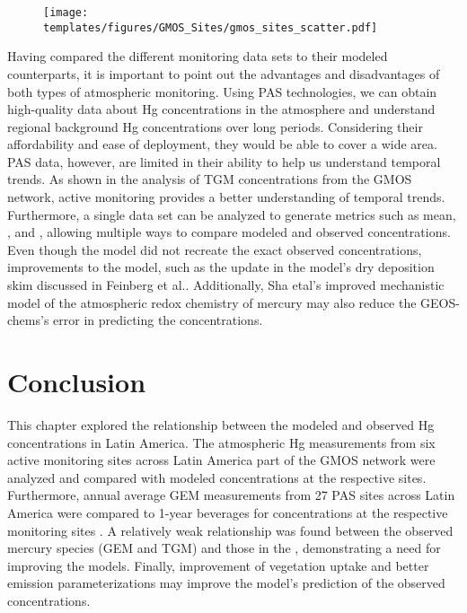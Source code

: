  \begin{figure}[H]
\texttt{[image: templates/figures/GMOS\_Sites/gmos\_sites\_scatter.pdf]}
\centering
{}
\label{fig:gmos_sites_scatter}
\end{figure}
\FloatBarrier
\begin{flushleft}
 Having compared the different monitoring data sets to their modeled counterparts, it is important to point out the advantages and disadvantages of both types of atmospheric monitoring. Using PAS technologies, we can obtain high-quality data about Hg concentrations in the atmosphere and understand regional background Hg concentrations over long periods. Considering their affordability and ease of deployment, they would be able to cover a wide area. PAS data, however, are limited in their ability to help us understand temporal trends. As shown in the analysis of TGM concentrations from the GMOS network, active monitoring provides a better understanding of temporal trends. Furthermore, a single data set can be analyzed to generate metrics such as mean, \iq, and \nft, allowing multiple ways to compare modeled and observed concentrations.  Even though the model did not recreate the exact observed concentrations, improvements to the model, such as the update in the model's dry deposition skim discussed in Feinberg et al.\cite{feinberg_evaluating_2022}. Additionally, Sha etal\cite{shah_improved_2021}'s improved mechanistic model of the atmospheric redox chemistry of mercury may also reduce the GEOS-chems's error in predicting the concentrations.
\end{flushleft}

\section{Conclusion}\label{c2_conclusion}

\begin{flushleft}
This chapter explored the relationship between the modeled and observed Hg concentrations in Latin America. The atmospheric Hg measurements from six active monitoring sites  across Latin America part of the GMOS network were analyzed and compared with modeled \hg concentrations at the respective sites\cite{koenig_seasonal_2021,sprovieri_atmospheric_2016}. Furthermore, annual average GEM measurements from 27 PAS sites across Latin America were compared to 1-year beverages for \hg concentrations at the respective monitoring sites \cite{quant_measuring_2021}.  A relatively weak relationship was found between the observed mercury species (GEM and TGM) and those in the \on, demonstrating a need for improving the models. Finally, improvement of vegetation uptake and better emission parameterizations may improve the model's prediction of the observed concentrations.

\end{flushleft}